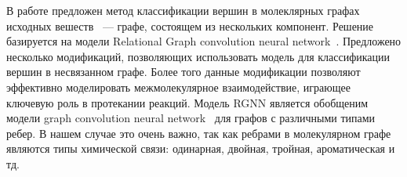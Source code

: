 \documentclass[12pt, twoside]{article}
\begin{document}
В работе предложен метод классификации вершин в молеклярных графах исходных вешеств ~--- графе, состоящем из нескольких компонент. Решение базируется на модели Relational Graph convolution neural network~\cite{schlichtkrull2018modeling}. Предложено несколько модификаций, позволяющих использовать модель для классификации вершин в несвязанном графе. Более того данные модификации позволяют эффективно моделировать межмолекулярное взаимодействие, играющее ключевую роль в протекании реакций. Модель RGNN является обобщеним модели graph convolution neural network~\cite{kipf2016semi} для графов с различными типами ребер. В нашем случае это очень важно, так как ребрами в молекулярном графе являются типы химической связи: одинарная, двойная, тройная, ароматическая и тд. 



 

{}

\end{document}
